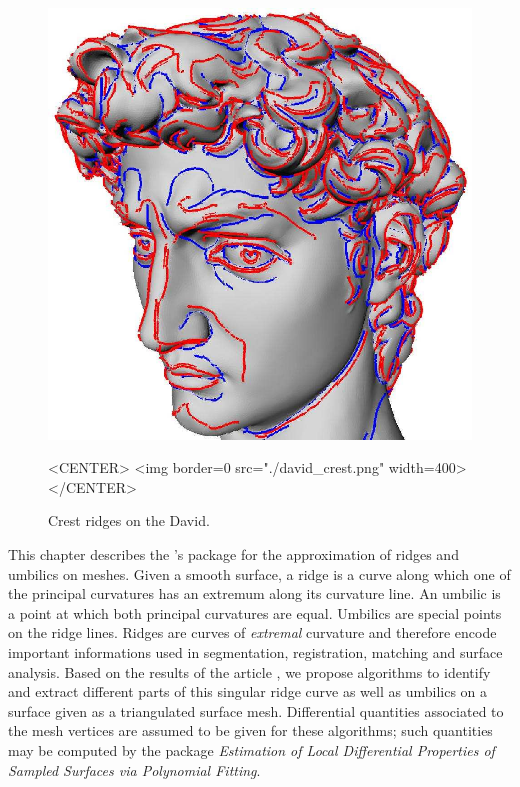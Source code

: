 

\newcommand{\FC}[1]{\protect{===FC SAYS: {#1}}}



\newtheorem{definition}{Definition.}
\newcommand{\hot}{h.o.t}%


\begin{figure}[!ht]
\begin{ccTexOnly}
\centerline{
\includegraphics[width=.5\linewidth]{Ridges_3/david_crest}}
\end{ccTexOnly}
\caption{Crest ridges on the David.}
\label{david-crest}
\begin{ccHtmlOnly}
<CENTER> <img border=0 src="./david_crest.png" width=400>
</CENTER>
\end{ccHtmlOnly}
\end{figure}

This chapter describes the \cgal's package for the approximation of
ridges and umbilics on meshes.  Given a smooth surface, a ridge is a
curve along which one of the principal curvatures has an extremum
along its curvature line. An umbilic is a point at which both
principal curvatures are equal. Umbilics are special points on the
ridge lines. Ridges are curves of {\em extremal} curvature and
therefore encode important informations used in segmentation,
registration, matching and surface analysis.  Based on the results of
the article \cite{cgal:cp-tdare-05}, we propose algorithms to identify
and extract different parts of this singular ridge curve as well as
umbilics on a surface given as a triangulated surface mesh. Differential
quantities associated to the mesh vertices are assumed to be given for
these algorithms; such quantities may be computed by the package {\em
Estimation of Local Differential Properties of Sampled Surfaces via
Polynomial Fitting}.


